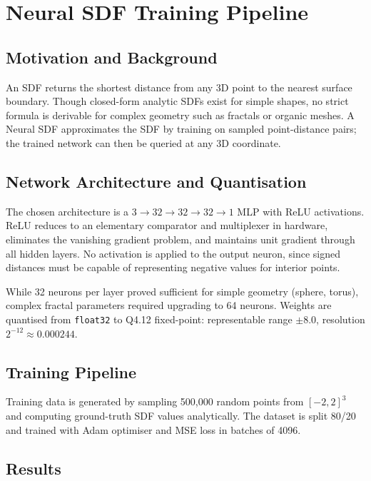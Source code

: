 \section{Neural SDF Training Pipeline}

\subsection{Motivation and Background}

An SDF returns the shortest distance from any 3D point to the nearest surface
boundary. Though closed-form analytic SDFs exist for simple shapes, no strict
formula is derivable for complex geometry such as fractals or organic meshes.
A Neural SDF approximates the SDF by training on sampled point-distance pairs;
the trained network can then be queried at any 3D coordinate.

\subsection{Network Architecture and Quantisation}

The chosen architecture is a $3\to32\to32\to32\to1$ MLP with ReLU activations.
ReLU reduces to an elementary comparator and multiplexer in hardware, eliminates
the vanishing gradient problem, and maintains unit gradient through all hidden
layers. No activation is applied to the output neuron, since signed distances
must be capable of representing negative values for interior points.

While 32 neurons per layer proved sufficient for simple geometry (sphere, torus),
complex fractal parameters required upgrading to 64 neurons. Weights are
quantised from \texttt{float32} to Q4.12 fixed-point: representable range
$\pm 8.0$, resolution $2^{-12} \approx 0.000244$.

\subsection{Training Pipeline}

Training data is generated by sampling 500,000 random points from $[-2, 2]^3$
and computing ground-truth SDF values analytically. The dataset is split 80/20
and trained with Adam optimiser and MSE loss in batches of 4096.

\subsection{Results}

